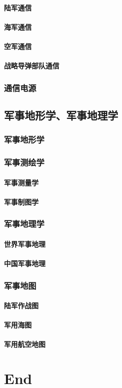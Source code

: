 \documentclass[UTF8]{../ApplicationUniverse}
\begin{document}
        \subsubsection{陆军通信}
        \subsubsection{海军通信}
        \subsubsection{空军通信}
        \subsubsection{战略导弹部队通信}
    \subsection{通信电源}

\section{军事地形学、军事地理学}
    \subsection{军事地形学}
    \subsection{军事测绘学}
        \subsubsection{军事测量学}
        \subsubsection{军事制图学}
    \subsection{军事地理学}
        \subsubsection{世界军事地理}
        \subsubsection{中国军事地理}
    \subsection{军事地图}
        \subsubsection{陆军作战图}
        \subsubsection{军用海图}
        \subsubsection{军用航空地图}

\chapter{End}
\end{document}
